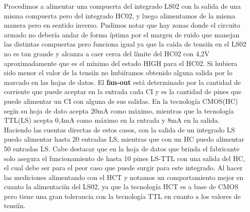 Procedimos a alimentar una compuerta del integrado LS02 con la salida de una misma compuerta pero del integrado HC02, y luego alimentamos de la misma manera pero en sentido inverso. Pudimos notar que hay zonas donde el circuito armado no debería andar de forma íptima por el margen de ruido que manejan las distintas compuertas pero funciona igual ya que la caída de tensiín en el LS02 no es tan grande y alcanza a caer cerca del límite del HC02 con 4,2V aproximadamente que es el mínimo del estado HIGH para el HC02. Si hubiera sido menor el valor de la tensiín no hubiíramos obtenido alguna salida por lo marcado en las hojas de datos.
\newline
El \textbf{fan-out} está determinado por la cantidad de corriente que puede aceptar en la entrada cada CI y es la cantidad de pines que puede alimentar un CI con alguna de sus salidas. En la tecnología CMOS(HC) segín su hoja de dato acepta 20mA como máximo, mientras que la tecnología TTL(LS) acepta 0,4mA como máximo en la entrada y 8mA en la salida. Haciendo las cuentas directas de estos casos, con la salida de un integrado LS puedo alimentar hasta 20 entradas LS, mientras que con un HC puedo alimentar 50 entradas LS. Cabe destacar que en la hoja de datos que brinda el fabricante solo asegura el funcionamiento de hasta 10 pines LS-TTL con una salida del HC, el cual debe ser para el peor caso que puede surgir para este integrado.
\newline
Al hacer las mediciones alimentando con el HCT y notamos un comportamiento mejor en cuanto la alimentaciín del LS02, ya que la tecnología HCT es a base de CMOS pero tiene una gran tolerancia con la tecnología TTL en cuanto a los valores de tensiín.